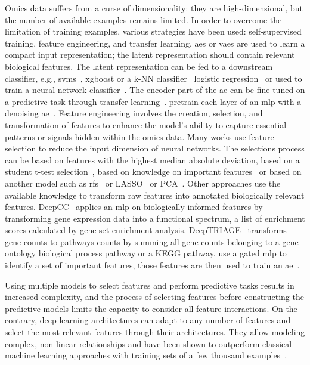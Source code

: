 \documentclass[../main.tex]{subfiles}
\begin{document}
	Omics data suffers from a curse of dimensionality: they are high-dimensional, but the number of available examples remains limited.
	In order to overcome the limitation of training examples, various strategies have been used: self-supervised training, feature engineering, and transfer learning.
	\Glspl{ae} or \glspl{vae} are used to learn a compact input representation; the latent representation should contain relevant biological features.
	The latent representation can be fed to a downstream classifier, e.g., \glspl{svm}~\cite{Zhang2020}, \gls{xgboost} or a k-NN classifier~\cite{Arafa2023} logistic regression~\cite{Wang2018} or used to train a neural network classifier~\cite{Karim2019}.
	The encoder part of the \gls{ae} can be fine-tuned on a predictive task through transfer learning~\cite{Levy2020,Kaczmarek2022}.
	\citeauthor{Hanczar2018} pretrain each layer of an \gls{mlp} with a denoising \gls{ae}~\cite{Hanczar2018}.
	Feature engineering involves the creation, selection, and transformation of features to enhance the model's ability to capture essential patterns or signals hidden within the omics data.
	Many works use feature selection to reduce the input dimension of neural networks.
	The selections process can be based on features with the highest median absolute deviation, based on a student t-test selection~\cite{Liu2019}, based on knowledge on important features~\cite{Kaczmarek2022} or based on another model such as \glspl{rf}~\cite{Wojewodzic2021,Liu2019} or LASSO~\cite{Liu2019} or PCA~\cite{Yu2019}.
	Other approaches use the available knowledge to transform raw features into annotated biologically relevant features.
	DeepCC~\cite{gaoDeepCCNovelDeep2019} applies an \gls{mlp} on biologically informed features by transforming gene expression data into a functional spectrum, \ie{}a list of enrichment scores calculated by gene set enrichment analysis.
	DeepTRIAGE~\cite{beykikhoshkDeepTRIAGEInterpretableIndividualised2020a} transforms gene counts to pathways counts by summing all gene counts belonging to a gene ontology biological process pathway or a KEGG pathway.
	\citeauthor{Zhang2020} use a gated \gls{mlp} to identify a set of important features, those features are then used to train an \gls{ae}~\cite{Zhang2020}.

	Using multiple models to select features and perform predictive tasks results in increased complexity, and the process of selecting features before constructing the predictive models limits the capacity to consider all feature interactions.
	On the contrary, deep learning architectures can adapt to any number of features and select the most relevant features through their architectures.
	They allow modeling complex, non-linear relationships and have been shown to outperform classical machine learning approaches with training sets of a few thousand examples~\cite{Hanczar2022}.
\end{document}
